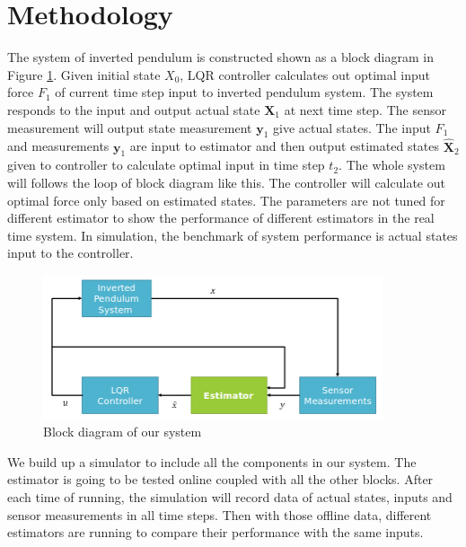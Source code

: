 \documentclass{article}
\newcommand{\matr}[1]{\bm{#1}}     %
\begin{document}
\section{Methodology} 
The system of inverted pendulum is constructed shown as a block diagram in Figure \ref{fig:block_diagram}. Given initial state $X_0$, LQR controller  calculates out optimal input force $F_1$ of current time step input to inverted pendulum system. The system responds to the input and output actual state $\matr{X}_1$ at next time step. The sensor measurement will output state measurement $\matr{y}_1$ give actual states. The input $F_1$ and measurements $\matr{y}_1$ are input to estimator and then output estimated states $\matr{\hat{X}}_2$ given to controller to calculate optimal input in time step $t_2$. The whole system will follows the loop of block diagram like this. The controller will calculate out optimal force only based on estimated states. The parameters are not tuned for different estimator to show the performance of different estimators in the real time system. In simulation, the benchmark of system performance is actual states input to the controller.
\begin{figure}[h!]
	\centering
	\includegraphics[width=10cm,keepaspectratio]{SystemArchitecture.png}
	\caption{Block diagram of our system}
	\label{fig:block_diagram}
\end{figure}
We build up a simulator to include all the components in our system. The estimator is going to be tested online coupled with all the other blocks. After each time of running, the simulation will record data of actual states, inputs and sensor measurements in all time steps. Then with those offline data, different estimators are running to compare their performance with the same inputs. 
\end{document}
